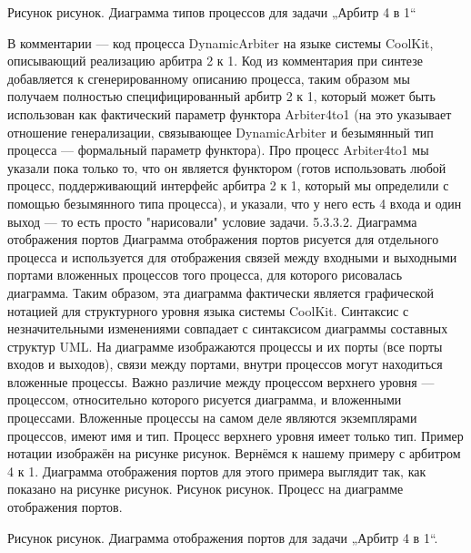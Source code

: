 Рисунок рисунок. Диаграмма типов процессов для задачи „Арбитр 4 в 1“

В комментарии --- код процесса DynamicArbiter на языке системы CoolKit, описывающий реализацию арбитра 2 к 1. Код из комментария при синтезе добавляется к сгенерированному описанию процесса, таким образом мы получаем полностью специфицированный арбитр 2 к 1, который может быть использован как фактический параметр функтора Arbiter4to1 (на это указывает отношение генерализации, связывающее DynamicArbiter и безымянный тип процесса --- формальный параметр функтора). Про процесс Arbiter4to1 мы указали пока только то, что он является функтором (готов использовать любой процесс, поддерживающий интерфейс арбитра 2 к 1, который мы определили с помощью безымянного типа процесса), и указали, что у него есть 4 входа и один выход --- то есть просто "нарисовали" условие задачи.
5.3.3.2. Диаграмма отображения портов
Диаграмма отображения портов рисуется для отдельного процесса и используется для отображения связей между входными и выходными портами вложенных процессов того процесса, для которого рисовалась диаграмма. Таким образом, эта диаграмма фактически является графической нотацией для структурного уровня языка системы CoolKit. Синтаксис с незначительными изменениями совпадает с синтаксисом диаграммы составных структур UML. На диаграмме изображаются процессы и их порты (все порты входов и выходов), связи между портами, внутри процессов могут находиться вложенные процессы. Важно различие между процессом верхнего уровня --- процессом, относительно которого рисуется диаграмма, и вложенными процессами. Вложенные процессы на самом деле являются экземплярами процессов, имеют имя и тип. Процесс верхнего уровня имеет только тип. Пример нотации изображён на рисунке рисунок. Вернёмся к нашему примеру с арбитром 4 к 1. Диаграмма отображения портов для этого примера выглядит так, как показано на рисунке рисунок.
Рисунок рисунок. Процесс на диаграмме отображения портов.

Рисунок рисунок. Диаграмма отображения портов для задачи „Арбитр 4 в 1“.

